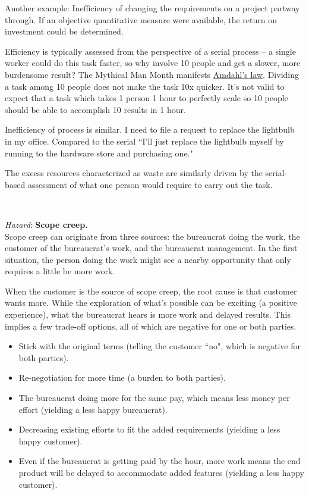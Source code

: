 Another example: Inefficiency of changing the requirements on a project partway through. If an objective quantitative measure were available, the return on investment could be determined. 

Efficiency is typically assessed from the perspective of a serial process -- a single worker could do this task faster, so why involve 10 people and get a slower, more burdensome result? The Mythical Man Month manifests \href{https://en.wikipedia.org/wiki/Amdahl\%27s_law}{Amdahl's law}.
Dividing a task among 10 people does not make the task 10x quicker. It's not valid to expect that a task which takes 1 person 1 hour to perfectly scale so 10 people should be able to accomplish 10 results in 1 hour.

Inefficiency of process is similar. I need to file a request to replace the lightbulb in my office. Compared to the serial ``I'll just replace the lightbulb myself by running to the hardware store and purchasing one."

The excess resources characterized as waste are similarly driven by the serial-based assessment of what one person would require to carry out the task. 

\ \\
\begin{samepage}
\textit{Hazard}: \textbf{Scope creep.}\label{sec:scope-creep} \\
Scope creep can originate from three sources: the bureaucrat doing the work, the customer of the bureaucrat's work, and the bureaucrat management. In the first situation, the person doing the work might see a nearby opportunity that only requires a little be more work. 
\end{samepage}

When the customer is the source of scope creep, the root cause is that customer wants more. While the exploration of what's possible can be exciting (a positive experience), what the bureaucrat hears is more work and delayed results. This implies a few trade-off options, all of which are negative for one or both parties.
\begin{itemize}
    \item Stick with the original terms (telling the customer ``no", which is negative for both parties).
    \item Re-negotiation for more time (a burden to both parties).
    \item The bureaucrat doing more for the same pay, which means less money per effort (yielding a less happy bureaucrat).
    \item Decreasing existing efforts to fit the added requirements (yielding a less happy customer).
    \item Even if the bureaucrat is getting paid by the hour, more work means the end product will be delayed to accommodate added features (yielding a less happy customer).
\end{itemize}


